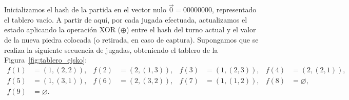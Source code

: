 Inicializamos el hash de la partida en el vector nulo $\vec{0} = 00000000$, representado el tablero vacío. A partir de aquí, por cada jugada efectuada, actualizamos el estado aplicando la operación XOR ($\oplus$) entre el hash del turno actual y el valor de la nueva piedra colocada (o retirada, en caso de captura). Supongamos que se realiza la siguiente secuencia de jugadas,
obteniendo el tablero de la Figura~\ref{fig:tablero_ejsko}: \begin{align*}
	f(1)&=(1,(2,2)), &f(2)&=(2,(1,3)),	&f(3)&=(1,(2,3)), &f(4)&=(2,(2,1)),\\
	f(5)&=(1,(3,1)), &f(6)&=(2,(3,2)), &f(7)&=(1,(1,2)), &f(8)&=\varnothing,\\
	f(9)&=\varnothing. 
\end{align*} 
